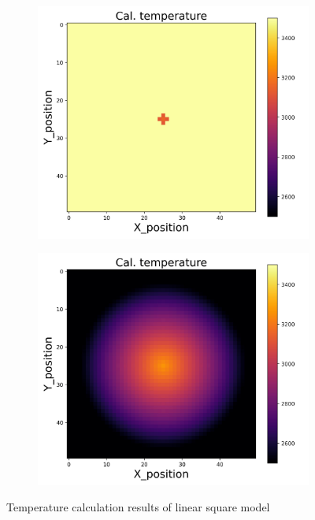 {\begin{figure}[h]
\begin{minipage}{\textwidth}
\begin{subfigure}{0.27\textwidth}
        \end{subfigure}
        \begin{subfigure}{0.27\textwidth}
            \centering
            \includegraphics[width=\textwidth]{figures/raw_data/32/T3500/lin_square/T_cal.jpg}
        \end{subfigure}
        \begin{subfigure}{0.27\textwidth}
            \centering
            \includegraphics[width=\textwidth]{figures/raw_data/33/T3500/lin_square/T_cal.jpg}
        \end{subfigure}
    \end{minipage}
    \caption{Temperature calculation results of linear square model}  
\end{figure}

}
